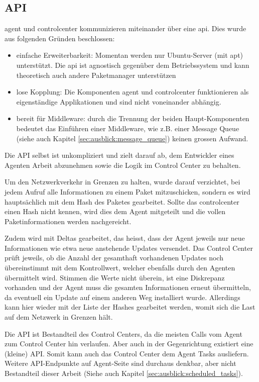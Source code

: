\subsection*{API}
\label{sec:architecture:api}

\gls{agent} und \gls{controlcenter} kommunizieren miteinander über eine \gls{api}. Dies wurde aus folgenden Gründen beschlossen:

\begin{itemize}
    \item einfache Erweiterbarkeit: Momentan werden nur Ubuntu-Server (mit \gls{apt}) unterstützt. Die \gls{api} ist agnostisch gegenüber dem Betriebssystem und kann theoretisch auch andere Paketmanager unterstützen
    \item lose Kopplung: Die Komponenten \gls{agent} und \gls{controlcenter} funktionieren als eigenständige Applikationen und sind nicht voneinander abhängig.
    \item bereit für Middleware: durch die Trennung der beiden Haupt-Komponenten bedeutet das Einführen einer Middleware, wie z.B. einer Message Queue (siehe auch Kapitel \ref{sec:ausblick:message_queue}) keinen grossen Aufwand.
\end{itemize}

Die API selbst ist unkompliziert und zielt darauf ab, dem Entwickler eines Agenten Arbeit abzunehmen sowie die Logik im Control Center zu behalten.

Um den Netzwerkverkehr in Grenzen zu halten, wurde darauf verzichtet, bei jedem Aufruf alle Informationen zu einem Paket mitzuschicken, sondern es wird hauptsächlich mit dem Hash des Paketes gearbeitet. Sollte das \gls{controlcenter} einen Hash nicht kennen, wird dies dem Agent mitgeteilt und die vollen Paketinformationen werden nachgereicht.

Zudem wird mit Deltas gearbeitet, das heisst, dass der Agent jeweils nur neue Informationen wie etwa neue anstehende Updates versendet. Das Control Center prüft jeweils, ob die Anzahl der gesamthaft vorhandenen Updates noch übereinstimmt mit dem Kontrollwert, welcher ebenfalls durch den Agenten übermittelt wird. Stimmen die Werte nicht überein, ist eine Diskrepanz vorhanden und der Agent muss die gesamten Informationen erneut übermitteln, da eventuell ein Update auf einem anderen Weg installiert wurde. Allerdings kann hier wieder mit der Liste der Hashes gearbeitet werden, womit sich die Last auf dem Netzwerk in Grenzen hält.

Die API ist Bestandteil des Control Centers, da die meisten Calls vom Agent zum Control Center hin verlaufen. Aber auch in der Gegenrichtung existiert eine (kleine) API. Somit kann auch das Control Center dem Agent Tasks ausliefern. Weitere API-Endpunkte auf Agent-Seite sind durchaus denkbar, aber nicht Bestandteil dieser Arbeit (Siehe auch Kapitel \ref{sec:ausblick:scheduled_tasks}).

